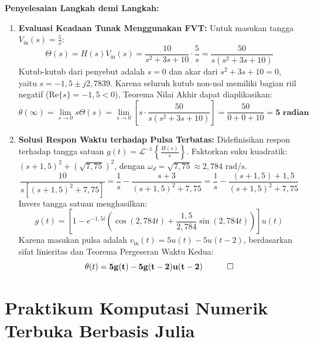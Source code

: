 \documentclass[11pt,a4paper]{article}
\theoremstyle{definition}
\begin{document}
\noindent\textbf{Penyelesaian Langkah demi Langkah:}
\begin{enumerate}[leftmargin=*]
    \item \textbf{Evaluasi Keadaan Tunak Menggunakan FVT:}
    Untuk masukan tangga $V_{\text{in}}(s) = \frac{5}{s}$:
    \begin{equation*}
        \Theta(s) = H(s) V_{\text{in}}(s) = \frac{10}{s^2 + 3s + 10} \cdot \frac{5}{s} = \frac{50}{s(s^2 + 3s + 10)}
    \end{equation*}
    Kutub-kutub dari penyebut adalah $s = 0$ dan akar dari $s^2 + 3s + 10 = 0$, yaitu $s = -1{,}5 \pm j 2{,}7839$. Karena seluruh kutub non-nol memiliki bagian riil negatif ($\text{Re}\{s\} = -1{,}5 < 0$), Teorema Nilai Akhir dapat diaplikasikan:
    \begin{equation*}
        \theta(\infty) = \lim_{s \to 0} s \Theta(s) = \lim_{s \to 0} \left[ s \cdot \frac{50}{s(s^2 + 3s + 10)} \right] = \frac{50}{0 + 0 + 10} = \mathbf{5\text{ radian}}
    \end{equation*}
    
    \item \textbf{Solusi Respon Waktu terhadap Pulsa Terbatas:}
    Didefinisikan respon terhadap tangga satuan $g(t) = \mathcal{L}^{-1}\left\{ \frac{H(s)}{s} \right\}$.
    Faktorkan suku kuadratik: $(s + 1{,}5)^2 + (\sqrt{7{,}75})^2$, dengan $\omega_d = \sqrt{7{,}75} \approx 2{,}784\text{ rad/s}$.
    \begin{equation*}
        \frac{10}{s[(s + 1{,}5)^2 + 7{,}75]} = \frac{1}{s} - \frac{s + 3}{(s + 1{,}5)^2 + 7{,}75} = \frac{1}{s} - \frac{(s + 1{,}5) + 1{,}5}{(s + 1{,}5)^2 + 7{,}75}
    \end{equation*}
    Invers tangga satuan menghasilkan:
    \begin{equation*}
        g(t) = \left[ 1 - e^{-1{,}5 t} \left( \cos(2{,}784 t) + \frac{1{,}5}{2{,}784} \sin(2{,}784 t) \right) \right] u(t)
    \end{equation*}
    Karena masukan pulsa adalah $v_{\text{in}}(t) = 5 u(t) - 5 u(t - 2)$, berdasarkan sifat linieritas dan Teorema Pergeseran Waktu Kedua:
    \begin{equation*}
        \theta(t) = \mathbf{5 g(t) - 5 g(t - 2) u(t - 2)} \quad \qed
    \end{equation*}
\end{enumerate}

\section{Praktikum Komputasi Numerik Terbuka Berbasis Julia}
\end{document}
